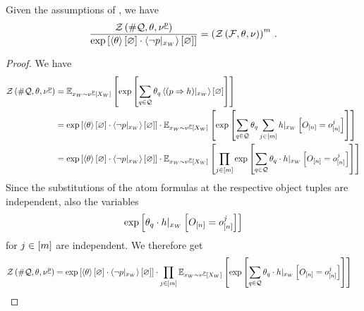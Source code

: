 \begin{lemma}
    \label{lem:FOLpartitionfunctionfactorization}
    Given the assumptions of , we have
    \begin{align*}
        \frac{\mathcal{Z}\left(\#\mathcal{Q},\theta,\nu^{\underline{p}}\right)}{\mathrm{exp}\left[\left\langle \theta\right\rangle \left[ \varnothing \right] \cdot \left\langle {\lnot p}|_{x_{W}}\right\rangle \left[ \varnothing \right]\right]}
        = \left(\mathcal{Z}\left(\mathcal{F},\theta,\nu\right)\right)^m \, .
    \end{align*}
\end{lemma}
\begin{proof}
    We have
    \begin{align*}
        \mathcal{Z}\left(\#\mathcal{Q},\theta,\nu^{\underline{p}}\right)
        &= \mathbb{E}_{x_{W}\sim\nu^{\underline{p}}\left[X_{W}\right]}\left[
            \mathrm{exp}\left[\sum_{q\in\mathcal{Q}}\theta_{q}\left\langle {(p\Rightarrow h)}|_{x_{W}}\right\rangle \left[ \varnothing \right]\right]
        \right] \\
        &= \mathrm{exp}\left[\left\langle \theta\right\rangle \left[ \varnothing \right] \cdot \left\langle {\lnot p}|_{x_{W}}\right\rangle \left[ \varnothing \right]\right] \cdot
        \mathbb{E}_{x_{W}\sim\nu^{\underline{p}}\left[X_{W}\right]}\left[
            \mathrm{exp}\left[\sum_{q\in\mathcal{Q}}\theta_{q}  \sum_{j\in[m]} {h}|_{x_{W}} \left[O_{[n]}=o_{[n]}^{j}\right] \right]
        \right] \\
        &= \mathrm{exp}\left[\left\langle \theta\right\rangle \left[ \varnothing \right] \cdot \left\langle {\lnot p}|_{x_{W}}\right\rangle \left[ \varnothing \right]\right] \cdot
        \mathbb{E}_{x_{W}\sim\nu^{\underline{p}}\left[X_{W}\right]}\left[
            \prod_{j\in[m]} \mathrm{exp}\left[ \sum_{q\in\mathcal{Q}} \theta_{q} \cdot {h}|_{x_{W}} \left[O_{[n]}=o_{[n]}^{j}\right] \right]
        \right]
    \end{align*}
    Since the substitutions of the atom formulas at the respective object tuples are independent, also the variables
    \begin{align*}
        \mathrm{exp}\left[\theta_{q}  \cdot {h}|_{x_{W}} \left[O_{[n]}=o_{[n]}^{j}\right]  \right]
    \end{align*}
    for $j\in[m]$ are independent.
    We therefore get
    \begin{align}
        \label{eq:independentSamplesFOL}
        \mathcal{Z}\left(\#\mathcal{Q},\theta,\nu^{\underline{p}}\right)
        &= \mathrm{exp}\left[\left\langle \theta\right\rangle \left[ \varnothing \right] \cdot \left\langle {\lnot p}|_{x_{W}}\right\rangle \left[ \varnothing \right]\right] \cdot
        \prod_{j\in[m]}
        \mathbb{E}_{x_{W}\sim\nu^{\underline{p}}\left[X_{W}\right]}\left[
            \mathrm{exp}\left[ \sum_{q\in\mathcal{Q}} \theta_{q} \cdot {h}|_{x_{W}} \left[O_{[n]}=o_{[n]}^{j}\right] \right]
        \right]
    \end{align}

\end{proof}
